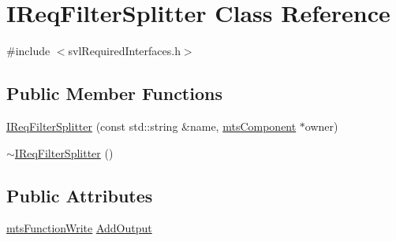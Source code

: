 \hypertarget{class_i_req_filter_splitter}{\section{I\-Req\-Filter\-Splitter Class Reference}
\label{class_i_req_filter_splitter}
}


{\ttfamily \#include $<$svl\-Required\-Interfaces.\-h$>$}

\subsection*{Public Member Functions}
\begin{DoxyCompactItemize}
\item 
\hyperlink{class_i_req_filter_splitter_af6fe9ff13442f8824d932749aac73a01}{I\-Req\-Filter\-Splitter} (const std\-::string \&name, \hyperlink{classmts_component}{mts\-Component} $\ast$owner)
\item 
\hyperlink{class_i_req_filter_splitter_a88ae268fc2fdb127a912544a4899e312}{$\sim$\-I\-Req\-Filter\-Splitter} ()
\end{DoxyCompactItemize}
\subsection*{Public Attributes}
\begin{DoxyCompactItemize}
\item 
\hyperlink{classmts_function_write}{mts\-Function\-Write} \hyperlink{class_i_req_filter_splitter_a6ff964bb398adbabf59001b97b16c539}{Add\-Output}
\end{DoxyCompactItemize}


